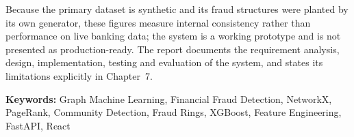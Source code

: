 Because the primary dataset is synthetic and its fraud structures were planted by its own generator, these figures measure internal consistency rather than performance on live banking data; the system is a working prototype and is not presented as production-ready. The report documents the requirement analysis, design, implementation, testing and evaluation of the system, and states its limitations explicitly in Chapter~7.

\vspace{10pt}
\noindent\textbf{Keywords:} Graph Machine Learning, Financial Fraud Detection, NetworkX, PageRank, Community Detection, Fraud Rings, XGBoost, Feature Engineering, FastAPI, React
\clearpage

